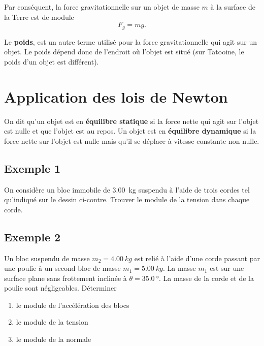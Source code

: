 Par conséquent, la force gravitationnelle sur un objet de masse $m$ à la
surface de la Terre est de module
\[
  F_g = mg.
\]

Le \textbf{poids}, est un autre terme utilisé pour la force gravitationnelle
qui agit sur un objet.  Le poids dépend donc de l'endroit où l'objet est situé
(sur Tatooine, le poids d'un objet est différent).


\section{Application des lois de Newton}

On dit qu'un objet est en \textbf{équilibre statique} si la force nette qui
agit sur l'objet est nulle et que l'objet est au repos.  Un objet est en
\textbf{équilibre dynamique} si la force nette sur l'objet est nulle mais qu'il
se déplace à vitesse constante non nulle.


\subsection{Exemple 1}

On considère un bloc immobile de \SI{3.00}{kg} suspendu à l'aide de trois
cordes tel qu'indiqué sur le dessin ci-contre.  Trouver le module de la tension
dans chaque corde.

\begin{marginfigure}
\end{marginfigure}


\subsection{Exemple 2}

Un bloc suspendu de masse $m_2 = \SI{4.00}{kg}$ est relié à l'aide d'une
corde passant par une poulie à un second bloc de masse $m_1 = \SI{5.00}{kg}$.
La masse $m_1$ est sur une surface plane sans frottement inclinée à
$\theta = \SI{35.0}{\degree}$.  La masse de la corde et de la poulie sont
négligeables.  Déterminer
\begin{enumerate}
  \item le module de l'accélération des blocs
  \item le module de la tension
  \item le module de la normale
\end{enumerate}

